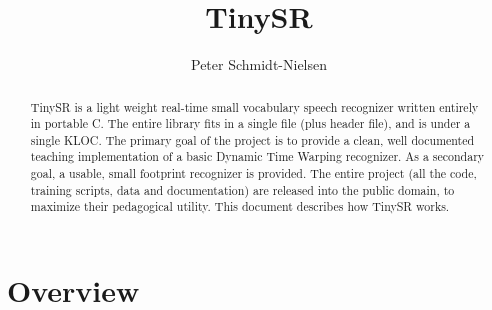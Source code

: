 \documentclass{article}
\title{TinySR}
\author{Peter Schmidt-Nielsen}
\begin{document}
\maketitle
\begin{abstract}
TinySR is a light weight real-time small vocabulary speech recognizer written entirely in portable C.
The entire library fits in a single file (plus header file), and is under a single KLOC.
The primary goal of the project is to provide a clean, well documented teaching implementation of a basic Dynamic Time Warping recognizer.
As a secondary goal, a usable, small footprint recognizer is provided.
The entire project (all the code, training scripts, data and documentation) are released into the public domain, to maximize their pedagogical utility.
This document describes how TinySR works.
\end{abstract}
\section{Overview}
\end{document}
